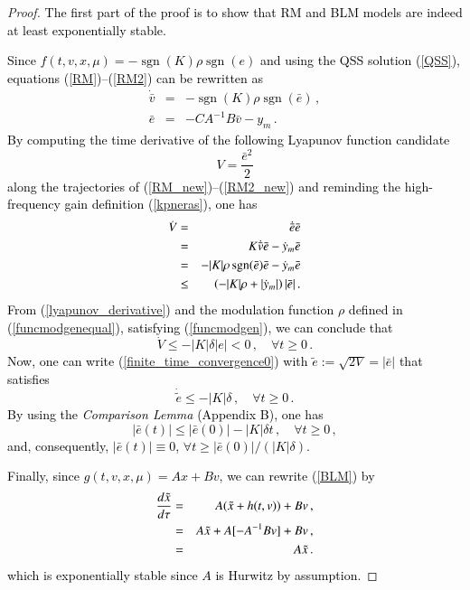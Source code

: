 \documentclass[review]{elsarticle}
\newcommand{\sgn}{\operatorname{sgn}}
\begin{document}
\begin{proof}
%
\textcolor{black}{
The first part of the proof is to show that RM and BLM models are indeed at least exponentially stable.}

\textcolor{black}{
Since $f(t,v,x,\mu)=-\sgn(K)\rho\sgn(e)$ and using the QSS solution (\ref{QSS}), equations (\ref{RM})--(\ref{RM2}) can be rewritten as
%
\begin{eqnarray} \label{RM_new}
\dot{\bar{v}} &=& -\sgn(K)\rho\sgn(\bar{e})\,,\\
\bar{e}&=&-CA^{-1}B\bar{v}-y_m\,. \label{RM2_new}
\end{eqnarray}
%
By computing the time derivative of the following Lyapunov function candidate
%
\begin{equation} \label{lyapunov}
V=\frac{\bar{e}^2}{2}
\end{equation}
%
along the trajectories of (\ref{RM_new})--(\ref{RM2_new}) and reminding the high-frequency gain definition (\ref{kpneras}), one has
%
\begin{eqnarray}
\dot{V}&=&\dot{\bar{e}}\bar{e} \notag \\
&=& K \dot{\bar{v}}\bar{e}- \dot{y}_m\bar{e} \notag \\
&=&-|K|\rho\sgn(\bar{e})\bar{e}-\dot{y}_m\bar{e} \notag \\
&\leq& \left(-|K|\rho+|\dot{y}_m|\right)|\bar{e}| \,. \label{lyapunov_derivative}
\end{eqnarray}
%
From (\ref{lyapunov_derivative}) and the modulation function $\rho$ defined in (\ref{funcmodgenequal}), satisfying (\ref{funcmodgen}), we can conclude that
%
\begin{equation}
\dot{V}\leq -|K|\delta |e| < 0\,,  \quad \forall t \geq 0\,. \label{finite_time_convergence0}
\end{equation}
%
Now, one can write (\ref{finite_time_convergence0}) with $\tilde{e}:=\sqrt{2V}=|\bar{e}|$ that satisfies
%
\begin{equation}
\dot{\tilde{e}} \leq -|K|\delta \,, \quad \forall t \geq 0\,. \label{finite_time_convergence1}
\end{equation}
%
By using the \textit{Comparison Lemma} (Appendix B), one has
%
\begin{equation}
|\bar{e}(t)| \leq |\bar{e}(0)| -|K|\delta t\,, \quad \forall t \geq 0\,, \label{finite_time_convergence}
\end{equation}
%
and, consequently, $|\bar{e}(t)| \equiv 0$, $\forall t \geq |\bar{e}(0)|/(|K|\delta)$.}


\textcolor{black}{
Finally, since $g(t,v,x,\mu)=Ax+Bv$, we can rewrite (\ref{BLM}) by
%
\begin{eqnarray} \label{BLM_new}
\frac{d\tilde{x}}{d\tau} &=& A (\tilde{x}+h(t,v)) + Bv\,, \notag \\
&=& A \tilde{x}+ A[-A^{-1}Bv] + Bv\,, \notag \\
&=& A \tilde{x}\,.
\end{eqnarray}
%
which is exponentially stable since $A$ is Hurwitz by assumption.}



\end{proof}
\end{document}

